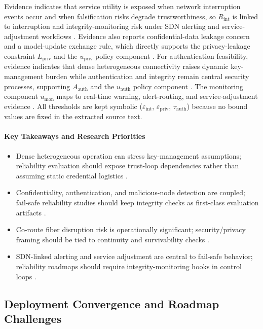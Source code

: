 Evidence indicates that service utility is exposed when network interruption events occur and when falsification risks degrade trustworthiness, so $R_{\mathrm{int}}$ is linked to interruption and integrity-monitoring risk under SDN alerting and service-adjustment workflows \cite{O_ISAC_041, O_ISAC_145}. Evidence also reports confidential-data leakage concern and a model-update exchange rule, which directly supports the privacy-leakage constraint $L_{\mathrm{priv}}$ and the $u_{\mathrm{priv}}$ policy component \cite{O_ISAC_039}. For authentication feasibility, evidence indicates that dense heterogeneous connectivity raises dynamic key-management burden while authentication and integrity remain central security processes, supporting $A_{\mathrm{auth}}$ and the $u_{\mathrm{auth}}$ policy component \cite{O_ISAC_156}. The monitoring component $u_{\mathrm{mon}}$ maps to real-time warning, alert-routing, and service-adjustment evidence \cite{O_ISAC_041}. All thresholds are kept symbolic ($\varepsilon_{\mathrm{int}}$, $\varepsilon_{\mathrm{priv}}$, $\tau_{\mathrm{auth}}$) because no bound values are fixed in the extracted source text.

\paragraph{Key Takeaways and Research Priorities}
\begin{itemize}
    \item Dense heterogeneous operation can stress key-management assumptions; reliability evaluation should expose trust-loop dependencies rather than assuming static credential logistics \cite{O_ISAC_156}.
    \item Confidentiality, authentication, and malicious-node detection are coupled; fail-safe reliability studies should keep integrity checks as first-class evaluation artifacts \cite{O_ISAC_156}.
    \item Co-route fiber disruption risk is operationally significant; security/privacy framing should be tied to continuity and survivability checks \cite{O_ISAC_041}.
    \item SDN-linked alerting and service adjustment are central to fail-safe behavior; reliability roadmaps should require integrity-monitoring hooks in control loops \cite{O_ISAC_041}.
\end{itemize}

\subsection{Deployment Convergence and Roadmap Challenges}

